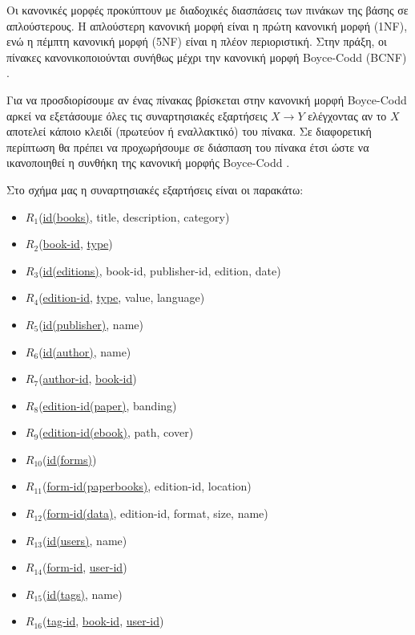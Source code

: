 \documentclass{assignment}
\begin{document}
Οι κανονικές μορφές προκύπτουν με διαδοχικές διασπάσεις των πινάκων της βάσης σε απλούστερους. Η απλούστερη κανονική μορφή είναι η πρώτη κανονική μορφή (1NF), ενώ η πέμπτη κανονική μορφή (5NF) είναι η πλέον περιοριστική. Στην πράξη, οι πίνακες κανονικοποιούνται συνήθως μέχρι την κανονική μορφή Boyce-Codd (BCNF) \cite{baseis_manolopoulos}.

Για να προσδιορίσουμε αν ένας πίνακας βρίσκεται στην κανονική μορφή Boyce-Codd αρκεί να εξετάσουμε όλες τις συναρτησιακές εξαρτήσεις $X \rightarrow Y$ ελέγχοντας αν το $X$ αποτελεί κάποιο κλειδί (πρωτεύον ή εναλλακτικό) του πίνακα. Σε διαφορετική περίπτωση θα πρέπει να προχωρήσουμε σε διάσπαση του πίνακα έτσι ώστε να ικανοποιηθεί η συνθήκη της κανονική μορφής Boyce-Codd \cite{baseis_manolopoulos, wiki:boyce-codd}.

Στο σχήμα μας η συναρτησιακές εξαρτήσεις είναι οι παρακάτω:
\begin{itemize}
\item $R_1$(\underline{id(books)}, title, description, category)
\item $R_2$(\underline{book-id}, \underline{type})
\item $R_3$(\underline{id(editions)}, book-id, publisher-id, edition, date)
\item $R_4$(\underline{edition-id}, \underline{type}, value, language)
\item $R_5$(\underline{id(publisher)}, name)
\item $R_6$(\underline{id(author)}, name)
\item $R_7$(\underline{author-id}, \underline{book-id})
\item $R_8$(\underline{edition-id(paper)}, banding)
\item $R_9$(\underline{edition-id(ebook)}, path, cover)
\item $R_{10}$(\underline{id(forms)})
\item $R_{11}$(\underline{form-id(paperbooks)}, edition-id, location)
\item $R_{12}$(\underline{form-id(data)}, edition-id, format, size, name)
\item $R_{13}$(\underline{id(users)}, name)
\item $R_{14}$(\underline{form-id}, \underline{user-id})
\item $R_{15}$(\underline{id(tags)}, name)
\item $R_{16}$(\underline{tag-id}, \underline{book-id}, \underline{user-id})
\end{itemize}
\end{document}
